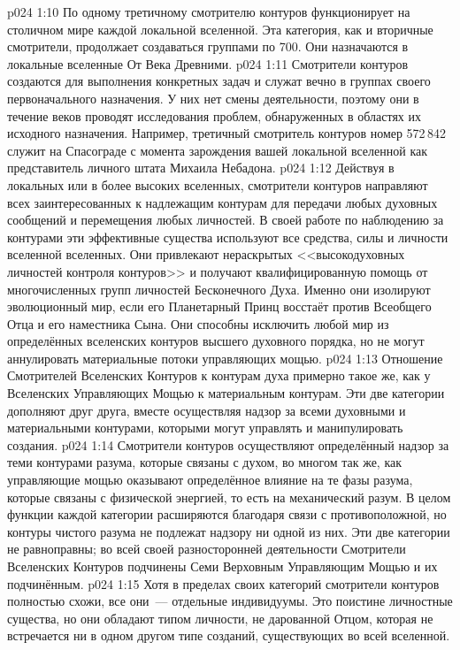 \vs p024 1:10 По одному третичному смотрителю контуров функционирует на столичном мире каждой локальной вселенной. Эта категория, как и вторичные смотрители, продолжает создаваться группами по 700. Они назначаются в локальные вселенные От Века Древними.
\vs p024 1:11 Смотрители контуров создаются для выполнения конкретных задач и служат вечно в группах своего первоначального назначения. У них нет смены деятельности, поэтому они в течение веков проводят исследования проблем, обнаруженных в областях их исходного назначения. Например, третичный смотритель контуров номер 572\,842 служит на Спасограде с момента зарождения вашей локальной вселенной как представитель личного штата Михаила Небадона.
\vs p024 1:12 \pc Действуя в локальных или в более высоких вселенных, смотрители контуров направляют всех заинтересованных к надлежащим контурам для передачи любых духовных сообщений и перемещения любых личностей. В своей работе по наблюдению за контурами эти эффективные существа используют все средства, силы и личности вселенной вселенных. Они привлекают нераскрытых <<высокодуховных личностей контроля контуров>> и получают квалифицированную помощь от многочисленных групп личностей Бесконечного Духа. Именно они изолируют эволюционный мир, если его Планетарный Принц восстаёт против Всеобщего Отца и его наместника Сына. Они способны исключить любой мир из определённых вселенских контуров высшего духовного порядка, но не могут аннулировать материальные потоки управляющих мощью.
\vs p024 1:13 \pc Отношение Смотрителей Вселенских Контуров к контурам духа примерно такое же, как у Вселенских Управляющих Мощью к материальным контурам. Эти две категории дополняют друг друга, вместе осуществляя надзор за всеми духовными и материальными контурами, которыми могут управлять и манипулировать создания.
\vs p024 1:14 Смотрители контуров осуществляют определённый надзор за теми контурами разума, которые связаны с духом, во многом так же, как управляющие мощью оказывают определённое влияние на те фазы разума, которые связаны с физической энергией, то есть на механический разум. В целом функции каждой категории расширяются благодаря связи с противоположной, но контуры чистого разума не подлежат надзору ни одной из них. Эти две категории не равноправны; во всей своей разносторонней деятельности Смотрители Вселенских Контуров подчинены Семи Верховным Управляющим Мощью и их подчинённым.
\vs p024 1:15 \pc Хотя в пределах своих категорий смотрители контуров полностью схожи, все они~--- отдельные индивидуумы. Это поистине личностные существа, но они обладают типом личности, не дарованной Отцом, которая не встречается ни в одном другом типе созданий, существующих во всей вселенной.
